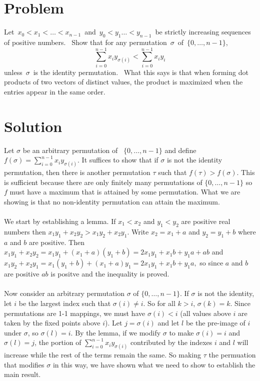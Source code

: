 \documentclass[11pt,a4paper]{report}
\theoremstyle{plain}
\theoremstyle{definition}
\theoremstyle{remark}
\begin{document}
\section*{Problem}
\sloppy Let $x_0 < x_1 < … < x_{n-1}$ and $y_0 < y_1 … < y_{n - 1}$ be strictly increasing sequences of positive numbers.  Show that for any permutation $\sigma$ of $\{0, … , n-1\}$,
$$\sum_{i = 0}^{n-1} x_i y_{\sigma(i)}< \sum_{i = 0}^{n-1} x_i y_i$$
unless $\sigma$ is the identity permutation.  What this says is that when forming dot products of two vectors of distinct values, the product is maximized when the entries appear in the same order.

\section*{Solution}
 Let $\sigma$ be an arbitrary permutation of  $\{0, … , n-1\}$ and define $f(\sigma) = \sum_{i = 0}^{n-1} x_i y_{\sigma(i)}$.   It suffices to show that if $\sigma$ is not the identity permutation, then there is another permutation $\tau$ such that $f(\tau) > f(\sigma)$.    This is sufficient because there are only finitely many permutations of $\{0, … , n-1\}$ so $f$ must have a maximum that is attained by some permutation.  What we are showing is that no non-identity permutation can attain the maximum.
 \\\\
 We start by establishing a lemma.
 \lem  If $x_1< x_2$ and $y_1 < y_2$ are positive real numbers then  $x_1 y_1 + x_2 y_2> x_1 y_2 + x_2 y_1$.
 \proof Write $x_2 = x_1 + a$ and $y_2 = y_1 + b$ where $a$ and $b$ are positive.  Then $x_1 y_1 + x_2 y_2 = x_1 y_1 + (x_1 + a)(y_1 + b) = 2x_1y_1 + x_1 b + y_1a + ab$ and $x_1 y_2 + x_2 y_1 = x_1(y_1 + b) + (x_1 + a)y_1 = 2x_1y_1 + x_1b + y_1a,$ so since $a$ and $b$ are positive $ab$ is positve and the inequality is proved.
 \\\\
 Now consider an arbitrary permutation $\sigma$ of $\{0, … , n-1\}$.  If $\sigma$ is not the identity, let $i$ be the largest index such that $\sigma(i)  \ne i$. So for all $k > i$, $\sigma(k) = k$.  Since permutations are 1-1 mappings, we must have $\sigma(i) < i$ (all values above $i$ are taken by the fixed points above $i$).  Let $j = \sigma(i)$ and let $l$ be the pre-image of $i$  under $\sigma$,  so $\sigma(l) = i$.  By the lemma, if we modify $\sigma$ to make $\sigma(i) = i$ and $\sigma(l) = j$, the portion of $\sum_{i = 0}^{n-1} x_i y_{\sigma(i)}$ contributed by the indexes $i$ and $l$ will increase while the rest of the terms remain the same.  So making $\tau$ the permuation that modifies $\sigma$ in this way, we have shown what we need to show to establish the main result.
\end{document}
